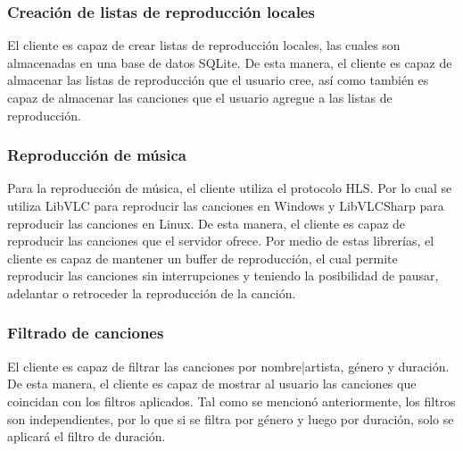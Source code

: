 \subsubsection{Creación de listas de reproducción locales}

El cliente es capaz de crear listas de reproducción locales, las cuales son
almacenadas en una base de datos SQLite. De esta manera, el cliente es capaz de
almacenar las listas de reproducción que el usuario cree, así como también es
capaz de almacenar las canciones que el usuario agregue a las listas de
reproducción.

\subsubsection{Reproducción de música}

Para la reproducción de música, el cliente utiliza el protocolo HLS. Por lo cual 
se utiliza LibVLC para reproducir las canciones en Windows y LibVLCSharp para
reproducir las canciones en Linux. De esta manera, el cliente es capaz de
reproducir las canciones que el servidor ofrece. Por medio de estas librerías,
el cliente es capaz de mantener un buffer de reproducción, el cual permite
reproducir las canciones sin interrupciones y teniendo la posibilidad 
de pausar, adelantar o retroceder la reproducción de la canción.

\subsubsection{Filtrado de canciones}

El cliente es capaz de filtrar las canciones por nombre|artista, género y
duración. De esta manera, el cliente es capaz de mostrar al usuario las
canciones que coincidan con los filtros aplicados. Tal como se mencionó
anteriormente, los filtros son independientes, por lo que si se filtra por
género y luego por duración, solo se aplicará el filtro de duración.